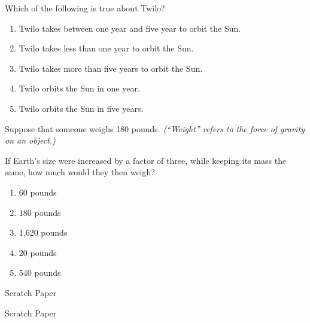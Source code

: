 \documentclass[12pt]{article}
\newcommand{\BC}{\begin{center}}
\newcommand{\EC}{\end{center}}
\begin{document}
\begin{enumerate}
\begin{minipage}{\textwidth}
{\bigskip

Which of the following is true about Twilo? 

\begin{enumerate}[label=(\Alph*)]
\setlength\itemsep{0.0em}
\item{ Twilo takes between one year and five year to orbit the Sun. }
\item{ Twilo takes less than one year to orbit the Sun. }
\item{ Twilo takes more than five years to orbit the Sun. }
\item{ Twilo orbits the Sun in one year. }
\item{ Twilo orbits the Sun in five years. }
\end{enumerate}
} %
\end{minipage}


\vspace{0.5in}

\begin{minipage}{\textwidth}
\item{Suppose that someone weighs 180 pounds. {\it (``Weight'' refers to the force of gravity on an object.)}

If Earth's size were increased by a factor of three, while keeping its mass the same, how much would they then weigh?

\begin{enumerate}[label=(\Alph*)]
\setlength\itemsep{0.0em}
\item{ 60 pounds }
\item{ 180 pounds }
\item{ 1,620 pounds }
\item{ 20 pounds }
\item{ 540 pounds }
\end{enumerate}
} %
\end{minipage}


\vspace{0.5in}

\end{enumerate}
\newpage\Large\sc\BC Scratch Paper\EC
\newpage\Large\sc\BC Scratch Paper\EC
\newpage
\end{document}
